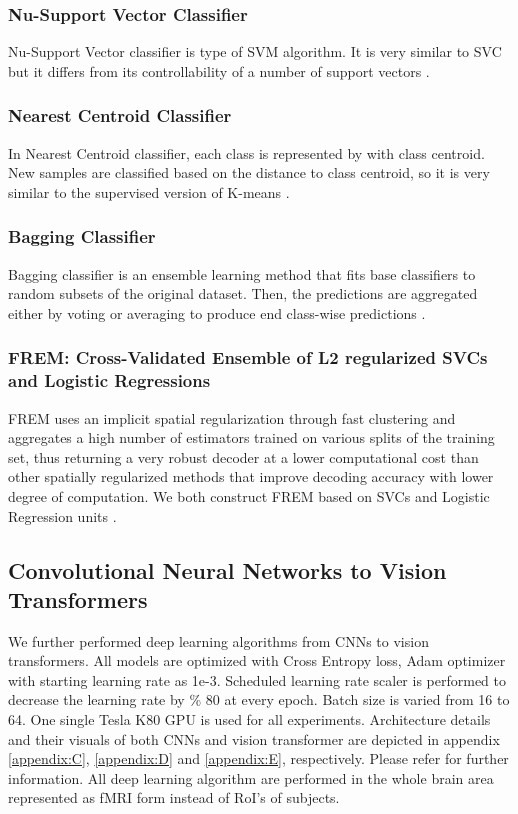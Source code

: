 \documentclass[10pt, twocolumn, letterpaper]{article}
\begin{document}
\subsubsection{Nu-Support Vector Classifier}
Nu-Support Vector classifier is type of SVM algorithm. It is very similar to SVC but it differs from its controllability of a number of support vectors \cite{scikit-learn}.

\subsubsection{Nearest Centroid Classifier}
In Nearest Centroid classifier, each class is represented by with class centroid. New samples are classified based on the distance to class centroid, so it is very similar to the supervised version of K-means \cite{scikit-learn}.

\subsubsection{Bagging Classifier}
Bagging classifier is an ensemble learning method that fits base classifiers to random subsets of the original dataset. Then, the predictions are aggregated either by voting or averaging to produce end class-wise predictions \cite{scikit-learn}.

\subsubsection{FREM: Cross-Validated Ensemble of L2 regularized SVCs and Logistic Regressions}
FREM uses an implicit spatial regularization through fast clustering and aggregates a high number of estimators trained on various splits of the training set, thus returning a very robust decoder at a lower computational cost than other spatially regularized methods \cite{sklearn_api} that improve decoding accuracy with lower degree of computation. We both construct FREM based on SVCs and Logistic Regression units \cite{sklearn_api}. 


\subsection{Convolutional Neural Networks to Vision Transformers}
We further performed deep learning algorithms from CNNs to vision transformers. All models are optimized with Cross Entropy loss, Adam optimizer with starting learning rate as 1e-3. Scheduled learning rate scaler is performed to decrease the learning rate by \% 80 at every epoch. Batch size is varied from 16 to 64. One single Tesla K80 GPU is used for all experiments. Architecture details and their visuals of both CNNs and vision transformer are depicted in appendix \ref{appendix:C}, \ref{appendix:D} and \ref{appendix:E}, respectively. Please refer for further information. All deep learning algorithm are performed in the whole brain area represented as fMRI form instead of RoI's of subjects.
\end{document}
